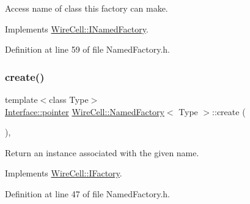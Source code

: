 Access name of class this factory can make. 



Implements \hyperlink{class_wire_cell_1_1_i_named_factory_aa66da8d5128e202367b56a0a340dc754}{Wire\+Cell\+::\+I\+Named\+Factory}.



Definition at line 59 of file Named\+Factory.\+h.

\mbox{\label{class_wire_cell_1_1_named_factory_a1f5abc7490577953e98a1bfd65671236}} 
\subsubsection{\texorpdfstring{create()}{create()}\hspace{0.1cm}{\footnotesize\ttfamily [1/2]}}
{\footnotesize\ttfamily template$<$class Type$>$ \\
\hyperlink{class_wire_cell_1_1_interface_a09c548fb8266cfa39afb2e74a4615c37}{Interface\+::pointer} \hyperlink{class_wire_cell_1_1_named_factory}{Wire\+Cell\+::\+Named\+Factory}$<$ Type $>$\+::create (\begin{DoxyParamCaption}{ }\end{DoxyParamCaption})\hspace{0.3cm}{\ttfamily [inline]}, {\ttfamily [virtual]}}



Return an instance associated with the given name. 



Implements \hyperlink{class_wire_cell_1_1_i_factory_a179e399381c19d1b49bcce704cee5c96}{Wire\+Cell\+::\+I\+Factory}.



Definition at line 47 of file Named\+Factory.\+h.

